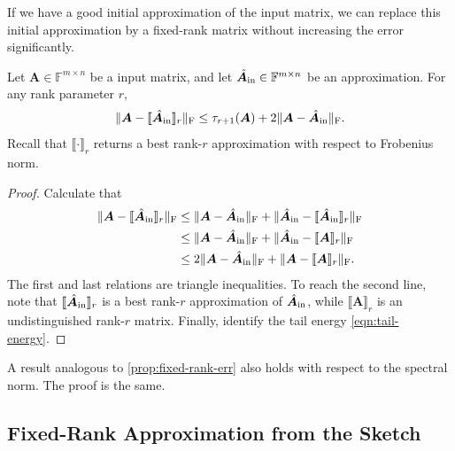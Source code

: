 \documentclass[final]{siamart1116}
\numberwithin{equation}{section}
\numberwithin{theorem}{section}
\numberwithin{figure}{section}
\newcommand{\F}{\mathbb{F}}
\newcommand{\mtx}[1]{\bm{#1}}
\newcommand{\norm}[1]{\Vert #1 \Vert}
\newcommand{\fnorm}[1]{\norm{#1}_{\mathrm{F}}}
\newcommand{\lowrank}[2]{\llbracket {#1} \rrbracket_{#2}}
\begin{document}
If we have a good initial approximation of the input matrix,
we can replace this initial approximation by a fixed-rank matrix
without increasing the error significantly.

\begin{proposition} \label{prop:fixed-rank-err}
Let $\mtx{A} \in \F^{m \times n}$ be a input matrix,
and let $\hat{\mtx{A}}_{\rm in} \in \F^{m \times n}$ be an approximation.
For any rank parameter $r$,
\begin{equation} \label{eqn:fixed-rank-frob}
\fnorm{ \mtx{A} - \lowrank{\hat{\mtx{A}}_{\rm in}}{r} }
	\leq \tau_{r+1}(\mtx{A}) + 2 \fnorm{ \mtx{A} - \hat{\mtx{A}}_{\rm in} }.
\end{equation}
Recall that $\lowrank{\cdot}{r}$ returns a best rank-$r$ approximation
with respect to Frobenius norm.
\end{proposition}

\begin{proof}
Calculate that
$$
\begin{aligned}
\fnorm{ \mtx{A} - \lowrank{\hat{\mtx{A}}_{\rm in} }{r} }
	&\leq \fnorm{ \mtx{A} - \hat{\mtx{A}}_{\rm in} } + \fnorm{ \hat{\mtx{A}}_{\rm in}  - \lowrank{\hat{\mtx{A}}_{\rm in}}{r} } \\
	&\leq \fnorm{ \mtx{A} - \hat{\mtx{A}}_{\rm in}  } + \fnorm{ \hat{\mtx{A}}_{\rm in}  - \lowrank{\mtx{A}}{r} } \\
	&\leq 2 \fnorm{ \mtx{A} - \hat{\mtx{A}}_{\rm in}  } + \fnorm{ \mtx{A} - \lowrank{\mtx{A}}{r} }.
\end{aligned}
$$
The first and last relations are triangle inequalities.  To reach the second line,
note that $\lowrank{\hat{\mtx{A}}_{\rm in}}{r}$ is a best rank-$r$ approximation of $\hat{\mtx{A}}_{\rm in}$,
while $\lowrank{ \mtx{A}}{r}$ is an undistinguished rank-$r$ matrix.
Finally, identify the tail energy \cref{eqn:tail-energy}.
\end{proof}

\begin{remark} \label{rem:fixed-rank-spec}
A result analogous to \cref{prop:fixed-rank-err} also holds
with respect to the spectral norm.  The proof is the same.
\end{remark}


\subsection{Fixed-Rank Approximation from the Sketch}
\end{document}
